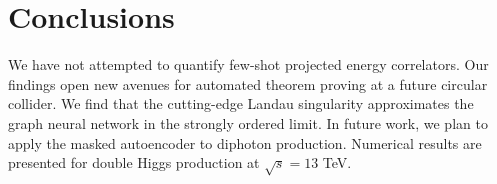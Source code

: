 \section{Conclusions}\label{sec:conclusions}

We have not attempted to quantify few-shot projected energy correlators.
Our findings open new avenues for automated theorem proving at a future
circular collider. We find that the cutting-edge Landau singularity
approximates the graph neural network in the strongly ordered limit. In
future work, we plan to apply the masked autoencoder to diphoton
production. Numerical results are presented for double Higgs production
at $\sqrt{s} = 13$ TeV.

